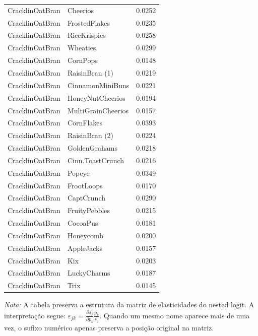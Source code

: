 \begin{table}[H]
\begin{tabular}{llr}
CracklinOatBran & Cheerios & 0.0252 \\
CracklinOatBran & FrostedFlakes & 0.0235 \\
CracklinOatBran & RiceKrispies & 0.0258 \\
CracklinOatBran & Wheaties & 0.0299 \\
CracklinOatBran & CornPops & 0.0148 \\
CracklinOatBran & RaisinBran (1) & 0.0219 \\
CracklinOatBran & CinnamonMiniBuns & 0.0221 \\
CracklinOatBran & HoneyNutCheerios & 0.0194 \\
CracklinOatBran & MultiGrainCheerios & 0.0157 \\
CracklinOatBran & CornFlakes & 0.0393 \\
CracklinOatBran & RaisinBran (2) & 0.0224 \\
CracklinOatBran & GoldenGrahams & 0.0218 \\
CracklinOatBran & Cinn.ToastCrunch & 0.0216 \\
CracklinOatBran & Popeye & 0.0349 \\
CracklinOatBran & FrootLoops & 0.0170 \\
CracklinOatBran & CaptCrunch & 0.0290 \\
CracklinOatBran & FruityPebbles & 0.0215 \\
CracklinOatBran & CocoaPus & 0.0181 \\
CracklinOatBran & Honeycomb & 0.0200 \\
CracklinOatBran & AppleJacks & 0.0157 \\
CracklinOatBran & Kix & 0.0203 \\
CracklinOatBran & LuckyCharms & 0.0187 \\
CracklinOatBran & Trix & 0.0145 \\
\bottomrule
\end{tabular}

\vspace{0.3em}
\footnotesize
\textit{Nota:} A tabela preserva a estrutura da matriz de elasticidades do nested logit. A interpretação segue: $\varepsilon_{jk}=\frac{\partial s_j}{\partial p_k}\frac{p_k}{s_j}$. Quando um mesmo nome aparece mais de uma vez, o sufixo numérico apenas preserva a posição original na matriz.
\end{table}
\endgroup


